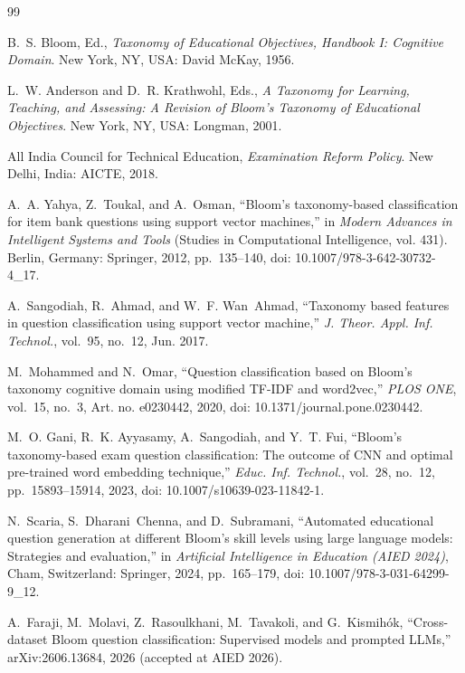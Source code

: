 \documentclass[conference]{IEEEtran}
\begin{document}
\begin{thebibliography}{99}
\footnotesize

B.~S. Bloom, Ed., \emph{Taxonomy of Educational Objectives, Handbook I: Cognitive Domain}.
New York, NY, USA: David McKay, 1956.

L.~W. Anderson and D.~R. Krathwohl, Eds., \emph{A Taxonomy for Learning, Teaching, and Assessing:
A Revision of Bloom's Taxonomy of Educational Objectives}. New York, NY, USA: Longman, 2001.

All India Council for Technical Education, \emph{Examination Reform Policy}. New Delhi, India:
AICTE, 2018.

A.~A. Yahya, Z.~Toukal, and A.~Osman, ``Bloom's taxonomy-based classification for item bank
questions using support vector machines,'' in \emph{Modern Advances in Intelligent Systems and
Tools} (Studies in Computational Intelligence, vol. 431). Berlin, Germany: Springer, 2012,
pp.~135--140, doi: 10.1007/978-3-642-30732-4\_17.

A.~Sangodiah, R.~Ahmad, and W.~F. Wan~Ahmad, ``Taxonomy based features in question
classification using support vector machine,'' \emph{J. Theor. Appl. Inf. Technol.}, vol.~95,
no.~12, Jun. 2017.

M.~Mohammed and N.~Omar, ``Question classification based on Bloom's taxonomy cognitive domain
using modified TF-IDF and word2vec,'' \emph{PLOS ONE}, vol.~15, no.~3, Art. no. e0230442, 2020,
doi: 10.1371/journal.pone.0230442.

M.~O. Gani, R.~K. Ayyasamy, A.~Sangodiah, and Y.~T. Fui, ``Bloom's taxonomy-based exam question
classification: The outcome of CNN and optimal pre-trained word embedding technique,''
\emph{Educ. Inf. Technol.}, vol.~28, no.~12, pp.~15893--15914, 2023,
doi: 10.1007/s10639-023-11842-1.

N.~Scaria, S.~Dharani~Chenna, and D.~Subramani, ``Automated educational question generation at
different Bloom's skill levels using large language models: Strategies and evaluation,'' in
\emph{Artificial Intelligence in Education (AIED 2024)}, Cham, Switzerland: Springer, 2024,
pp.~165--179, doi: 10.1007/978-3-031-64299-9\_12.

A.~Faraji, M.~Molavi, Z.~Rasoulkhani, M.~Tavakoli, and G.~Kismih\'{o}k, ``Cross-dataset Bloom
question classification: Supervised models and prompted LLMs,'' arXiv:2606.13684, 2026
(accepted at AIED 2026).


\end{thebibliography}
\end{document}
